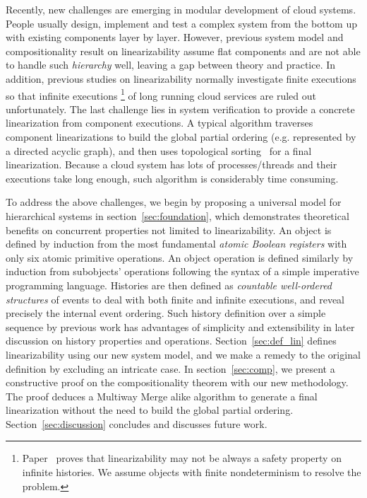 \documentclass[a4paper,USenglish]{lipics-v2016}
\newcommand{\lin}{linearizability}
\newcommand{\linz}{linearization}
\begin{document}
Recently, new challenges are emerging in modular development of cloud systems.
People usually design, implement and test a complex system from the bottom up with existing components layer by layer.
However, previous system model and compositionality result on {\lin} assume flat components and are not able to handle such \textit{hierarchy} well, leaving a gap between theory and practice.
In addition, previous studies on {\lin} normally investigate finite executions so that infinite executions
\footnote
{
	Paper~\cite{DBLP:conf/netys/GuerraouiR14} proves that {\lin} may not be always a safety property on infinite histories.
	We assume objects with finite nondeterminism to resolve the problem.
}
of long running cloud services are ruled out unfortunately.
The last challenge lies in system verification to provide a concrete {\linz} from component executions.
A typical algorithm traverses component {\linz}s to build the global partial ordering (e.g. represented by a directed acyclic graph), and then uses topological sorting~\cite{Cormen} for a final {\linz}.
Because a cloud system has lots of processes/threads and their executions take long enough,
such algorithm is considerably time consuming.

To address the above challenges,
we begin by proposing a universal model for hierarchical systems in section~\ref{sec:foundation},
which demonstrates theoretical benefits on concurrent properties not limited to {\lin}.
An object is defined by induction from the most fundamental \textit{atomic Boolean registers} with only six atomic primitive operations.
An object operation is defined similarly by induction from subobjects' operations following the syntax of a simple imperative programming language.
Histories are then defined as \textit{countable well-ordered structures} of events
to deal with both finite and infinite executions, and reveal precisely the internal event ordering.
Such history definition over a simple sequence by previous work has advantages of simplicity and extensibility 
in later discussion on history properties and operations.
Section~\ref{sec:def_lin} defines {\lin} using our new system model,
and we make a remedy to the original definition by excluding an intricate case.
In section~\ref{sec:comp},
we present a constructive proof on the compositionality theorem with our new methodology.
The proof deduces a Multiway Merge alike algorithm to generate a final {\linz} without the need to build the global partial ordering.
Section~\ref{sec:discussion} concludes and discusses future work.
\end{document}
